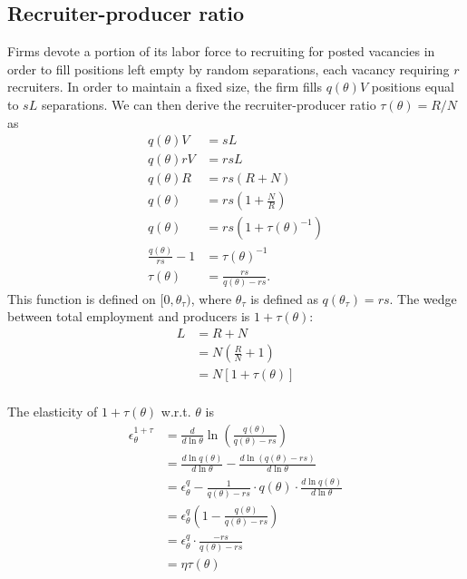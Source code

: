 \documentclass[12pt]{article}
\begin{document}
\subsection{Recruiter-producer ratio}
Firms devote a portion of its labor force to recruiting for posted vacancies in order to fill positions left empty by random separations, each vacancy requiring $r$ recruiters.
In order to maintain a fixed size, the firm fills $q(\theta)V$ positions equal to $sL$ separations.
We can then derive the recruiter-producer ratio $\tau(\theta) = R/N$ as
\begin{align*}
    q(\theta)V &= sL \\
    q(\theta)rV &= rsL \\
    q(\theta)R &= rs(R+N) \\
    q(\theta) &= rs \left( 1+\frac{N}{R} \right) \\
    q(\theta) &= rs \left( 1+\tau(\theta)^{-1} \right) \\
    \frac{q(\theta)}{rs} - 1 &= \tau(\theta)^{-1} \\
    \tau(\theta) &= \frac{rs}{q(\theta) - rs}.
\end{align*}
This function is defined on $[0, \theta_\tau)$, where $\theta_\tau$ is defined as $q(\theta_\tau) = rs$.
The wedge between total employment and producers is $1 + \tau(\theta)$:
\begin{align*}
    L &= R + N \\
    &= N \left( \frac{R}{N} + 1 \right) \\
    &= N [1 + \tau(\theta)] \\
\end{align*}

The elasticity of $1 + \tau(\theta)$ w.r.t. $\theta$ is
\begin{align*}
    \epsilon^{1+\tau}_\theta &= \frac{d}{d \ln \theta} \ln \left( \frac{q(\theta)}{q(\theta) - rs} \right) \\
    &= \frac{d \ln q(\theta)}{d \ln \theta} - \frac{d \ln (q(\theta) - rs)}{d \ln \theta} \\
    &= \epsilon^q_\theta - \frac{1}{q(\theta) - rs} \cdot q(\theta) \cdot \frac{d \ln q(\theta)}{d \ln \theta} \\
    &= \epsilon^q_\theta \left( 1 - \frac{q(\theta)}{q(\theta) - rs} \right) \\
    &= \epsilon^q_\theta \cdot \frac{-rs}{q(\theta) - rs} \\
    &= \eta \tau(\theta)
\end{align*}
\end{document}
